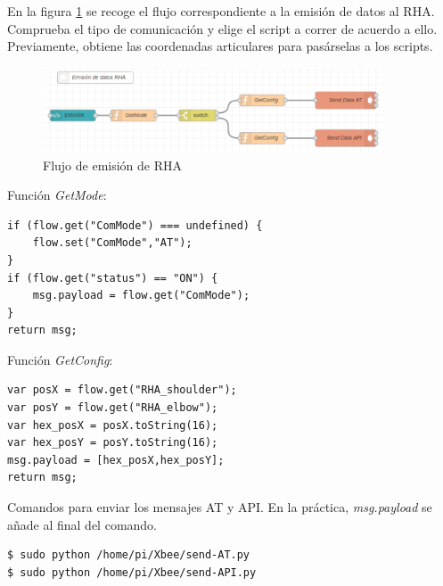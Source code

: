 En la figura \ref{fig:emisionRHA} se recoge el flujo correspondiente a la emisión de datos al RHA. Comprueba el tipo de comunicación y elige el script a correr de acuerdo a ello. Previamente, obtiene las coordenadas articulares para pasárselas a los scripts.

\begin{figure}[H]
\centering
\includegraphics[width=0.9\textwidth]{figuras/emisionFlowRHA.png}
\caption{Flujo de emisión de RHA}
\label{fig:emisionRHA}
\end{figure}

Función \textit{GetMode}:


\begin{lstlisting}[frame=leftline, caption={GetMode}, label=code:GetMode]
if (flow.get("ComMode") === undefined) {
    flow.set("ComMode","AT");
}
if (flow.get("status") == "ON") {
    msg.payload = flow.get("ComMode");
}
return msg;
\end{lstlisting}

Función \textit{GetConfig}:

\begin{lstlisting}[frame=leftline, caption={GetConfig}, label=code:GetConfig]
var posX = flow.get("RHA_shoulder");
var posY = flow.get("RHA_elbow");
var hex_posX = posX.toString(16);
var hex_posY = posY.toString(16);
msg.payload = [hex_posX,hex_posY];
return msg;
\end{lstlisting}

Comandos para enviar los mensajes AT y API. En la práctica, \textit{msg.payload} se añade al final del comando.


\begin{lstlisting}[frame=single, label=command:sendDataRHA]
$ sudo python /home/pi/Xbee/send-AT.py
$ sudo python /home/pi/Xbee/send-API.py
\end{lstlisting}

